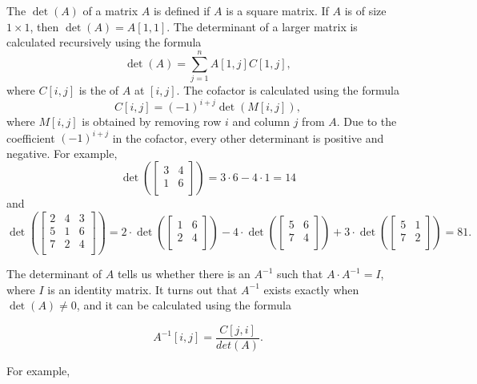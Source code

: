 
The  $\det(A)$ of a matrix $A$
is defined if $A$ is a square matrix.
If $A$ is of size $1 \times 1$,
then $\det(A)=A[1,1]$.
The determinant of a larger matrix is
calculated recursively using the formula 
\[\det(A)=\sum_{j=1}^n A[1,j] C[1,j],\]
where $C[i,j]$ is the  of $A$
at $[i,j]$.
The cofactor is calculated using the formula
\[C[i,j] = (-1)^{i+j} \det(M[i,j]),\]
where $M[i,j]$ is obtained by removing
row $i$ and column $j$ from $A$.
Due to the coefficient $(-1)^{i+j}$ in the cofactor,
every other determinant is positive
and negative.
For example,
\[
\det(
 \begin{bmatrix}
  3 & 4 \\
  1 & 6 \\
 \end{bmatrix}
) = 3 \cdot 6 - 4 \cdot 1 = 14 
\]
and
\[
\det(
 \begin{bmatrix}
  2 & 4 & 3 \\
  5 & 1 & 6 \\
  7 & 2 & 4 \\
 \end{bmatrix}
) = 
2 \cdot
\det(
 \begin{bmatrix}
  1 & 6 \\
  2 & 4 \\
 \end{bmatrix}
)
-4 \cdot
\det(
 \begin{bmatrix}
  5 & 6 \\
  7 & 4 \\
 \end{bmatrix}
)
+3 \cdot
\det(
 \begin{bmatrix}
  5 & 1 \\
  7 & 2 \\
 \end{bmatrix}
) = 81.
\]


The determinant of $A$ tells us
whether there is an 
$A^{-1}$ such that $A \cdot A^{-1} = I$,
where $I$ is an identity matrix.
It turns out that $A^{-1}$ exists
exactly when $\det(A) \neq 0$,
and it can be calculated using the formula

\[A^{-1}[i,j] = \frac{C[j,i]}{det(A)}.\]

For example,

